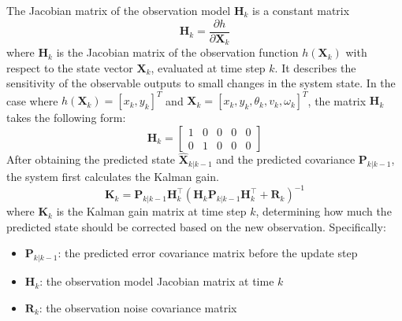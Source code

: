 \documentclass[12pt,a4paper]{article}
\numberwithin{equation}{section}
\begin{document}
The Jacobian matrix of the observation model $\mathbf{H}_k$ is a constant matrix
\begin{equation}
  \mathbf{H}_k = \frac{\partial h}{\partial \mathbf{X}_k}
\end{equation}
where $\mathbf{H}_k$ is the Jacobian matrix of the observation function
$h(\mathbf{X}_k)$ with respect to the state vector $\mathbf{X}_k$, evaluated at
time step $k$. It describes the sensitivity of the observable outputs to small
changes in the system state. In the case where $h(\mathbf{X}_k) = [x_k, y_k]^T$
and $\mathbf{X}_k = [x_k, y_k, \theta_k, v_k, \omega_k]^T$, the matrix
$\mathbf{H}_k$ takes the following form:
\[
  \mathbf{H}_k =
  \begin{bmatrix}
    1 & 0 & 0 & 0 & 0 \\
    0 & 1 & 0 & 0 & 0
  \end{bmatrix}
\]
After obtaining the predicted state \(\hat{\mathbf{X}}_{k|k-1}\) and the
predicted covariance \(\mathbf{P}_{k|k-1}\), the system first calculates the
Kalman gain.
\begin{equation}
  \mathbf{K}_k = \mathbf{P}_{k|k-1} \mathbf{H}_k^\top 
  \left( \mathbf{H}_k \mathbf{P}_{k|k-1} \mathbf{H}_k^\top + \mathbf{R}_k \right)^{-1}
  \label{eq:kalman_gain}
\end{equation}
where $\mathbf{K}_k$ is the Kalman gain matrix at time step $k$, determining how
much the predicted state should be corrected based on the new
observation. Specifically:
\begin{itemize}
\item $\mathbf{P}_{k|k-1}$: the predicted error covariance matrix before the
  update step
\item $\mathbf{H}_k$: the observation model Jacobian matrix at time $k$
\item $\mathbf{R}_k$: the observation noise covariance matrix
\end{itemize}
\end{document}

